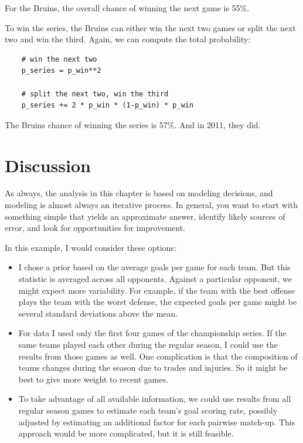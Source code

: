 \documentclass[12pt]{book}
\begin{document}
For the Bruins, the overall chance of winning the next game is 55\%.

To win the series, the Bruins can either win the next two games
or split the next two and win the third.  Again, we can compute
the total probability:

\begin{verbatim}
    # win the next two
    p_series = p_win**2

    # split the next two, win the third
    p_series += 2 * p_win * (1-p_win) * p_win
\end{verbatim}  

The Bruins chance of winning the series is 57\%.  And in 2011,
they did.


\section{Discussion}

As always, the analysis in this chapter is based on modeling decisions,
and modeling is almost always an iterative process.  In general,
you want to start with something simple that yields an approximate
answer, identify likely sources of error, and look for opportunities
for improvement.

In this example, I would consider these options:

\begin{itemize}

\item I chose a prior based on the average goals per game for each
  team.  But this statistic is averaged across all opponents.  Against
  a particular opponent, we might expect more variability.  For
  example, if the team with the best offense plays the team with the
  worst defense, the expected goals per game might be several standard
  deviations above the mean.

\item For data I used only the first four games of the championship
  series.  If the same teams played each other during the
  regular season, I could use the results from those games as well.
  One complication is that the composition of teams changes during
  the season due to trades and injuries.  So it might be best to
  give more weight to recent games.

\item To take advantage of all available information, we could
  use results from all regular season games to estimate each team's
  goal scoring rate, possibly adjusted by estimating
  an additional factor for each pairwise match-up.  This approach
  would be more complicated, but it is still feasible.

\end{itemize}
\end{document}

